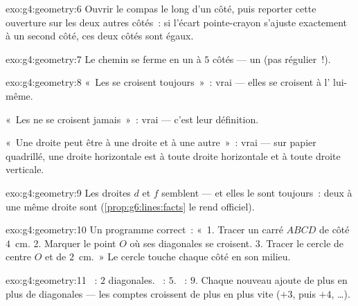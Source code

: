 \begin{solution}{exo:g4:geometry:6}
Ouvrir le compas le long d'un côté, puis reporter cette ouverture
sur les deux autres côtés~: si l'écart pointe-crayon s'ajuste
exactement à un second côté, ces deux côtés sont égaux.
\end{solution}

\begin{solution}{exo:g4:geometry:7}
Le chemin se ferme en un  à $5$ côtés --- un 
(pas régulier~!).
\end{solution}

\begin{solution}{exo:g4:geometry:8}
«~Les  se croisent toujours~»~: vrai ---
elles se croisent à l' lui-même.

«~Les  ne se croisent jamais~»~: vrai --- c'est
leur définition.

«~Une droite peut être  à une droite et  à
une autre~»~: vrai --- sur papier quadrillé, une droite horizontale
est  à toute droite horizontale et  à
toute droite verticale.
\end{solution}

\begin{solution}{exo:g4:geometry:9}
Les droites $d$ et $f$ semblent  --- et elles le sont
toujours~: deux  à une même droite sont
 (\cref{prop:g6:lines:facts} le rend officiel).
\end{solution}

\begin{solution}{exo:g4:geometry:10}
Un programme correct~: «~1. Tracer un carré $ABCD$ de côté $4$~cm.
2. Marquer le point $O$ où ses diagonales se croisent. 3. Tracer le
cercle de centre $O$ et de  $2$~cm.~» Le cercle touche chaque
côté en son milieu.
\end{solution}

\begin{solution}{exo:g4:geometry:11}
~: $2$ diagonales. ~: $5$. ~: $9$.
Chaque nouveau  ajoute de plus en plus de diagonales --- les
comptes croissent de plus en plus vite ($+3$, puis $+4$, \dots).
\end{solution}
